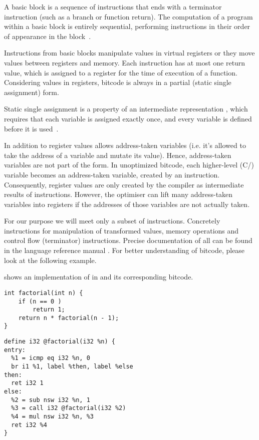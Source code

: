 \begin{definition}\label{def:basicblock}
A basic block is a sequence of instructions that ends with a terminator
instruction (such as a branch or function return). The computation of a program
within a basic block is entirely sequential, performing instructions in their
order of appearance in the block~\cite{Rockai15}.
\end{definition}

Instructions from basic blocks manipulate values in virtual registers or
they move values between registers and memory. Each instruction has at most one
return value, which is assigned to a register for the time of execution of a
function. Considering values in registers, \LLVM bitcode is always in a
partial \SSA (static single assignment) form.

\begin{definition}\label{def:ssa}
Static single assignment is a property of an intermediate representation
, which requires that each variable is assigned exactly once, and every
variable is defined before it is used~\cite{Cytron91}.
\end{definition}

In addition to register values \LLVMIR allows address-taken variables (i.e. it's
allowed to take the address of a variable and mutate its value).
Hence, address-taken variables are not part of the \SSA form. In unoptimized
\LLVM bitcode, each higher-level (C/\Cpp{}) variable becomes an address-taken
variable, created by an  instruction. Consequently, register values are only
created by the compiler as intermediate results of instructions. However, the \LLVM
optimiser can lift many address-taken variables into registers if the addresses
of those variables are not actually taken.

For our purpose we will meet only a subset of \LLVM instructions. Concretely
instructions for manipulation of transformed values, memory operations and
control flow (terminator) instructions. Precise documentation of all can be
found in the \LLVM language reference manual \cite{LLVM:langref}. For better
understanding of \LLVM bitcode, please look at the following example.

\begin{example} \label{ex:factorial}
shows an implementation of  in \Cpp{} and its corresponding \LLVM bitcode.

\begin{verbatim}
int factorial(int n) {
    if (n == 0 )
        return 1;
    return n * factorial(n - 1);
}
\end{verbatim}

\begin{verbatim}
define i32 @factorial(i32 %n) {
entry:
  %1 = icmp eq i32 %n, 0
  br i1 %1, label %then, label %else
then:
  ret i32 1
else:
  %2 = sub nsw i32 %n, 1
  %3 = call i32 @factorial(i32 %2)
  %4 = mul nsw i32 %n, %3
  ret i32 %4
}
\end{verbatim}
\end{example}

